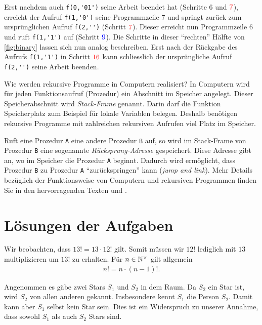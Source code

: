 \noindent
Erst nachdem auch \verb|f(0,'01')| seine Arbeit beendet hat (Schritte $6$ und $\textcolor{Red}{7}$), erreicht der Aufruf \verb|f(1,'0')| seine Programmzeile $7$ und springt zurück zum ursprünglichen Aufruf \verb|f(2,'')| (Schritt $\textcolor{Red}{7}$). Dieser erreicht nun Programmzeile $6$ und ruft \verb|f(1,'1')| auf (Schritt $\textcolor{Blue}{9}$). Die Schritte in dieser \enquote{rechten} Hälfte von \cref{fig:binary} lassen sich nun analog beschreiben. Erst nach der Rückgabe des Aufrufs \verb|f(1,'1')| in Schritt $\textcolor{Red}{16}$ kann schliesslich der ursprüngliche Aufruf \verb|f(2,'')| seine Arbeit beenden.

\clearpage
\begin{mysummary}{Wie werden rekursive Programme in Computern realisiert?}
In Computern wird für jeden Funktionsaufruf (Prozedur) ein Abschnitt im Speicher angelegt. Dieser Speicherabschnitt wird \textit{Stack-Frame} genannt. Darin darf die Funktion Speicherplatz zum Beispiel für lokale Variablen belegen. Deshalb benötigen rekursive Programme mit zahlreichen rekursiven Aufrufen viel Platz im Speicher.

Ruft eine Prozedur \verb|A| eine andere Prozedur \verb|B| auf, so wird im Stack-Frame von Prozedur \verb|B| eine sogenannte \textit{Rücksprung-Adresse} gespeichert. Diese Adresse gibt an, wo im Speicher die Prozedur \verb|A| beginnt. Dadurch wird ermöglicht, dass Prozedur \verb|B| zu Prozedur \verb|A| \enquote{zurückspringen} kann (\textit{jump and link}). Mehr Details bezüglich der Funktionsweise von Computern und rekursiven Programmen finden Sie in den hervorragenden Texten \cite{Malvino} und \cite{Sauter}.
\end{mysummary}

\clearpage
\section{Lösungen der Aufgaben}
\begin{myanswer}[myexercise:0301]
Wir beobachten, dass $13! = 13\cdot 12!$ gilt. Somit müssen wir $12!$ lediglich mit $13$ multiplizieren um $13!$ zu erhalten. Für $n\in\mathbb{N}^{\times}$ gilt allgemein
\begin{align*}
    n! = n\cdot (n-1)!.
\end{align*}
\end{myanswer}


\begin{myanswer}[myexercise:0350]
Angenommen es gäbe zwei Stars $S_1$ und $S_2$ in dem Raum. Da $S_2$ ein Star ist, wird $S_2$ von allen anderen gekannt. Insbesondere kennt $S_1$ die Person $S_2$. Damit kann aber $S_1$ selbst kein Star sein. Dies ist ein Widerspruch zu unserer Annahme, dass sowohl $S_1$ als auch $S_2$ Stars sind.
\end{myanswer}


